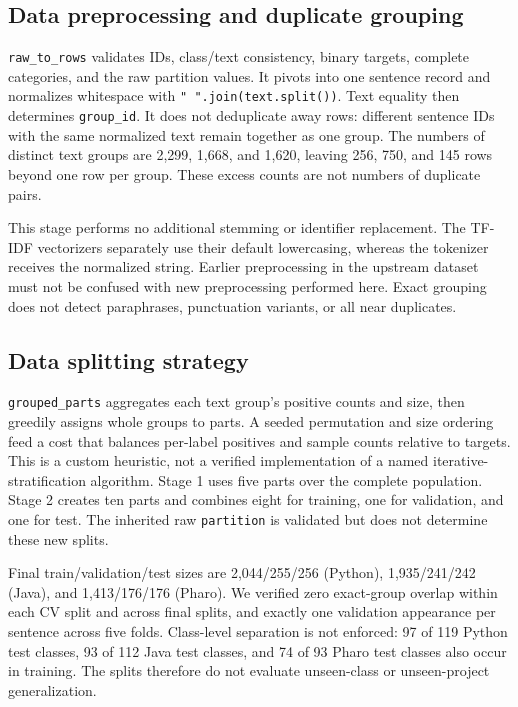 \subsection{Data preprocessing and duplicate grouping}
\texttt{raw\_to\_rows} validates IDs, class/text consistency, binary targets, complete categories, and the raw partition values. It pivots into one sentence record and normalizes whitespace with {\small\texttt{" ".join(text.split())}}. Text equality then determines \texttt{group\_id}. It does not deduplicate away rows: different sentence IDs with the same normalized text remain together as one group. The numbers of distinct text groups are 2,299, 1,668, and 1,620, leaving 256, 750, and 145 rows beyond one row per group. These excess counts are not numbers of duplicate pairs.

This stage performs no additional stemming or identifier replacement. The TF-IDF vectorizers separately use their default lowercasing, whereas the tokenizer receives the normalized string. Earlier preprocessing in the upstream dataset must not be confused with new preprocessing performed here. Exact grouping does not detect paraphrases, punctuation variants, or all near duplicates.

\subsection{Data splitting strategy}
\texttt{grouped\_parts} aggregates each text group's positive counts and size, then greedily assigns whole groups to parts. A seeded permutation and size ordering feed a cost that balances per-label positives and sample counts relative to targets. This is a custom heuristic, not a verified implementation of a named iterative-stratification algorithm. Stage 1 uses five parts over the complete population. Stage 2 creates ten parts and combines eight for training, one for validation, and one for test. The inherited raw \texttt{partition} is validated but does not determine these new splits.

Final train/validation/test sizes are 2,044/255/256 (Python), 1,935/241/242 (Java), and 1,413/176/176 (Pharo). We verified zero exact-group overlap within each CV split and across final splits, and exactly one validation appearance per sentence across five folds. Class-level separation is not enforced: 97 of 119 Python test classes, 93 of 112 Java test classes, and 74 of 93 Pharo test classes also occur in training. The splits therefore do not evaluate unseen-class or unseen-project generalization.

